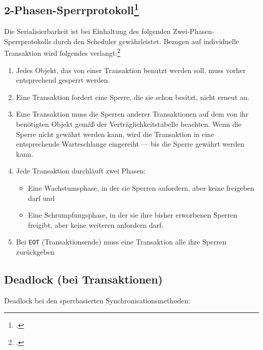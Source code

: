 \documentclass{lehramt-informatik-haupt}
\begin{document}
%

\subsection{2-Phasen-Sperrprotokoll\footcite[Seite 16]{db:fs:5}}

Die Serialisierbarkeit ist bei Einhaltung des folgenden
Zwei-Phasen-Sperrprotokolls durch den Scheduler gewährleistet. Bezogen
auf individuelle Transaktion wird folgendes verlangt:\footcite{wiki:sperrverfahren}

\begin{enumerate}
\item Jedes Objekt, das von einer Transaktion benutzt werden soll, muss
vorher entsprechend gesperrt werden.

\item Eine Transaktion fordert eine Sperre, die sie schon besitzt, nicht
erneut an.

\item Eine Transaktion muss die Sperren anderer Transaktionen auf dem
von ihr benötigten Objekt gemäß der Verträglichkeitstabelle beachten.
Wenn die Sperre nicht gewährt werden kann, wird die Transaktion in eine
entsprechende Warteschlange eingereiht — bis die Sperre gewährt werden
kann.

\item Jede Transaktion durchläuft zwei Phasen:

\begin{itemize}
\item Eine Wachstumsphase, in der sie Sperren anfordern, aber keine
freigeben darf und

\item Eine Schrumpfungsphase, in der sie ihre bisher erworbenen
Sperren freigibt, aber keine weiteren anfordern darf.
\end{itemize}

\item Bei \texttt{EOT} (Transaktionsende) muss eine Transaktion alle
ihre Sperren zurückgeben
\end{enumerate}

%

\subsection{Deadlock (bei Transaktionen)}

Deadlock bei den sperrbasierten Synchronisationsmethoden:
\end{document}
